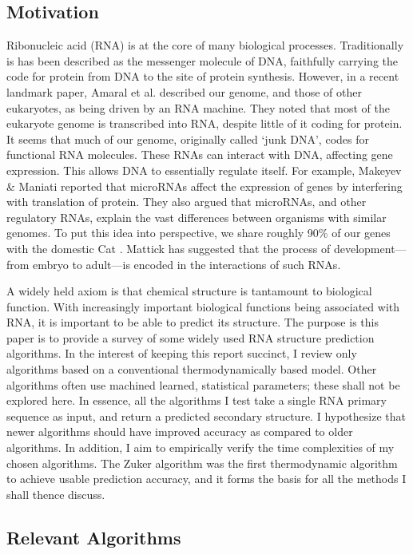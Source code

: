 \documentclass[12pt, a4paper]{article}
\begin{document}
\subsection{Motivation}
Ribonucleic acid (RNA) is at the core of many biological processes. Traditionally is has been described as the messenger molecule of DNA, faithfully carrying the code for protein from DNA to the site of protein synthesis. However, in a recent landmark paper, Amaral et al. \cite{amaral2008eukaryotic} described our genome, and those of other eukaryotes, as being driven by an RNA machine. They noted that most of the eukaryote genome is transcribed into RNA, despite little of it coding for protein. It seems that much of our genome, originally called `junk DNA', codes for functional RNA molecules. These RNAs can interact with DNA, affecting gene expression. This allows DNA to essentially regulate itself. For example, Makeyev \& Maniati \cite{makeyev2008multilevel} reported that microRNAs affect the expression of genes by interfering with translation of protein. They also argued that microRNAs, and other regulatory RNAs, explain the vast differences between organisms with similar genomes. To put this idea into perspective, we share roughly 90\% of our genes with the domestic Cat \cite{pontius2007initial}. Mattick \cite{mattick2007new} has suggested that the process of development---from embryo to adult---is encoded in the interactions of such RNAs.

A widely held axiom is that chemical structure is tantamount to biological function. With increasingly important biological functions being associated with RNA, it is important to be able to predict its structure. The purpose is this paper is to provide a survey of some widely used RNA structure prediction algorithms. In the interest of keeping this report succinct, I review only algorithms based on a conventional thermodynamically based model. Other algorithms often use machined learned, statistical parameters; these shall not be explored here. In essence, all the algorithms I test take a single RNA primary sequence as input, and return a predicted secondary structure. I hypothesize that newer algorithms should have improved accuracy as compared to older algorithms. In addition, I aim to empirically verify the time complexities of my chosen algorithms. The Zuker algorithm was the first thermodynamic algorithm to achieve usable prediction accuracy, and it forms the basis for all the methods I shall thence discuss.

\subsection{Relevant Algorithms}
\end{document}
